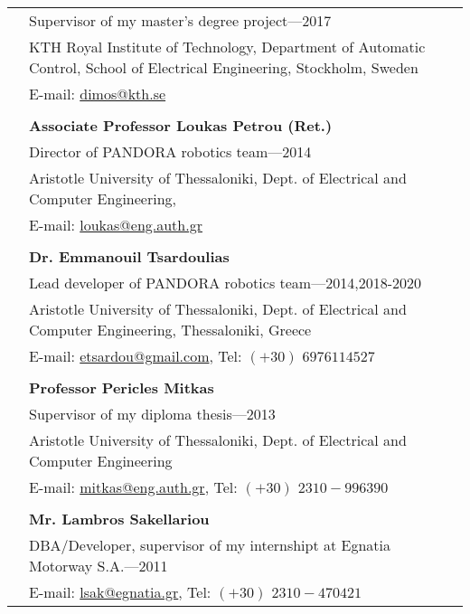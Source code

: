 \documentclass[a4paper,10pt,twoside]{article}
\begin{document}
\begin{tabular}{rp{14cm}}
& {Supervisor of my master's degree project}---2017\\
&KTH Royal Institute of Technology, Department of Automatic Control, School of Electrical Engineering, Stockholm, Sweden \\
& E-mail: \href{mailto: dimos@kth.se}{dimos@kth.se} \\
&\\
& \textbf{Associate Professor Loukas Petrou (Ret.)}\\
& {Director of PANDORA robotics team}---2014\\
&Aristotle University of Thessaloniki, Dept. of Electrical and Computer Engineering,\\
& E-mail: \href{mailto: loukas@eng.auth.gr}{loukas@eng.auth.gr} \\
&\\
& \textbf{Dr. Emmanouil Tsardoulias}\\
& {Lead developer of PANDORA robotics team}---2014,2018-2020\\
&Aristotle University of Thessaloniki, Dept. of Electrical and Computer Engineering, Thessaloniki, Greece \\
& E-mail: \href{mailto: etsardou@gmail.com}{etsardou@gmail.com}, Tel: $(+30)$ $697 611 4527$ \\
&\\
& \textbf{Professor Pericles Mitkas}\\
& {Supervisor of my diploma thesis}---2013\\
&Aristotle University of Thessaloniki, Dept. of Electrical and Computer Engineering\\
& E-mail: \href{mailto: mitkas@eng.auth.gr}{mitkas@eng.auth.gr}, Tel: $(+30)$ $2310-996390$ \\
&\\
& \textbf{Mr. Lambros Sakellariou}\\
& {DBA/Developer, supervisor of my internshipt at Egnatia Motorway S.A.}---2011\\
& E-mail: \href{mailto: lsak@egnatia.gr}{lsak@egnatia.gr}, Tel: $(+30)$ $2310 - 470421$ \\

\end{tabular}
\newpage
\end{document}
